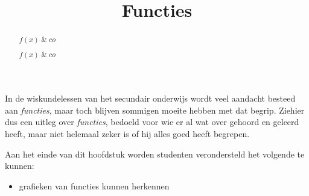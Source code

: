 \documentclass{ximera}
\title{Functies}
\begin{document}
\begin{abstract}
$f(x)  \;\&\; co$ 
\end{abstract}

\maketitle

  
In de wiskundelessen van het secundair onderwijs wordt veel aandacht besteed aan \textit{functies}, maar toch blijven sommigen moeite hebben met dat begrip. 
Ziehier dus een uitleg over \textit{functies}, bedoeld voor wie er al wat over gehoord en geleerd heeft, maar niet helemaal zeker is of hij alles goed heeft begrepen.

\begin{abstract}
    $f(x)  \;\&\; co$ 
\end{abstract}

\begin{sectionOutcomes}

Aan het einde van dit hoofdstuk worden studenten verondersteld het volgende te kunnen:

\begin{itemize}
\item grafieken van functies kunnen herkennen
\end{itemize}

\end{sectionOutcomes}
\end{document}
